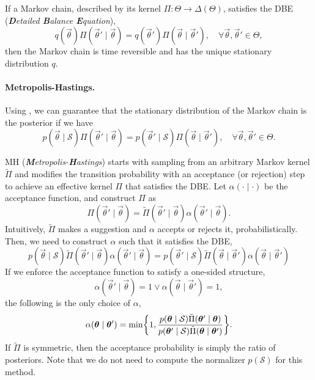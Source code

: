 \begin{lemma} \label{lem:dbe}
    If a Markov chain, described by its kernel $\Pi: \Theta \to \Delta(\Theta)$, satisfies the DBE (\textit{\textbf{D}etailed \textbf{B}alance \textbf{E}quation}), \[
        q(\vec{\theta}) \Pi(\vec{\theta}' \mid \vec{\theta}) = q(\vec{\theta}') \Pi(\vec{\theta} \mid \vec{\theta}'), \quad \forall \vec{\theta}, \vec{\theta}' \in \Theta,
    \]
    then the Markov chain is time reversible and has the unique stationary distribution $q$.
\end{lemma}

\paragraph{Metropolis-Hastings.}

Using , we can guarantee that the stationary distribution of the Markov chain is the
posterior if we have \[
    p(\vec{\theta} \mid \mathcal{S}) \Pi(\vec{\theta}' \mid \vec{\theta}) = p(\vec{\theta}' \mid \mathcal{S}) \Pi(\vec{\theta} \mid \vec{\theta}'), \quad \forall \vec{\theta}, \vec{\theta}' \in \Theta.
\]

MH (\textit{\textbf{M}etropolis-\textbf{H}astings}) starts with sampling from an arbitrary Markov
kernel $\tilde{\Pi}$ and modifies the transition probability with an acceptance (or rejection) step
to achieve an effective kernel $\Pi$ that satisfies the DBE. Let $\alpha(\cdot \mid \cdot)$ be the
acceptance function, and construct $\Pi$ as \[
    \Pi(\vec{\theta}' \mid \vec{\theta}) = \tilde{\Pi}(\vec{\theta}' \mid \vec{\theta}) \alpha(\vec{\theta}' \mid \vec{\theta}).
\]
Intuitively, $\tilde{\Pi}$ makes a suggestion and $\alpha$ accepts or rejects it,
probabilistically. Then, we need to construct $\alpha$ such that it satisfies the DBE, \[
    p(\vec{\theta}\mid \mathcal{S}) \tilde{\Pi}(\vec{\theta}' \mid \vec{\theta}) \alpha(\vec{\theta}' \mid \vec{\theta}) = p(\vec{\theta}' \mid \mathcal{S}) \tilde{\Pi}(\vec{\theta} \mid \vec{\theta}') \alpha(\vec{\theta} \mid \vec{\theta}')
\]
If we enforce the acceptance function to satisfy a one-sided structure, \[
    \alpha(\vec{\theta}' \mid \vec{\theta}) = 1 \lor \alpha(\vec{\theta} \mid \vec{\theta}') = 1,
\]
the following is the only choice of $\alpha$, \[
    \alpha(\vec{\theta} \mid \vec{\theta}') = \min \lft\{ 1, \frac{p(\vec{\theta} \mid \mathcal{S}) \tilde{\Pi}(\vec{\theta}' \mid \vec{\theta})}{p(\vec{\theta}' \mid \mathcal{S}) \tilde{\Pi}(\vec{\theta} \mid \vec{\theta}')} \rgt\}.
\]
If $\tilde{\Pi}$ is symmetric, then the acceptance probability is simply the ratio of posteriors.
Note that we do not need to compute the normalizer $p(\mathcal{S})$ for this method.

